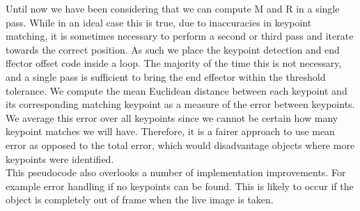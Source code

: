 Until now we have been considering that we can compute M and R in a single pass. While in an ideal case this is true, due to inaccuracies in keypoint matching, it is sometimes necessary to perform a second or third pass and iterate towards the correct position. As such we place the keypoint detection and end ffector offset code inside a loop. The majority of the time this is not necessary, and a single pass is sufficient to bring the end effector within the threshold tolerance. We compute the mean Euclidean distance between each keypoint and its corresponding matching keypoint as a measure of the error between keypoints. We average this error over all keypoints since we cannot be certain how many keypoint matches we will have. Therefore, it is a fairer approach to use mean error as opposed to the total error, which would disadvantage objects where more keypoints were identified.\\

This pseudocode also overlooks a number of implementation improvements. For example error handling if no keypoints can be found. This is likely to occur if the object is completely out of frame when the live image is taken.







